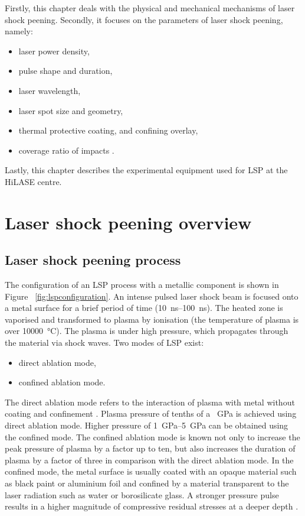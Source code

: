 Firstly, this chapter deals with the physical and mechanical mechanisms of laser shock peening. Secondly, it focuses on the parameters of laser shock peening, namely:

\begin{itemize}
    
    \item laser power density,
    \item pulse shape and duration,
    \item laser wavelength,
    \item laser spot size and geometry,
    \item thermal protective coating, and confining overlay,
    \item coverage ratio of impacts \cite{dane_2000}.

\end{itemize}

 Lastly, this chapter describes the experimental equipment used for LSP at the HiLASE centre. 


\section{Laser shock peening overview}

\subsection{Laser shock peening process}
The configuration of an LSP process with a metallic component is shown in Figure~ \ref{fig:lspconfiguration}. An intense pulsed laser shock beam is focused onto a metal surface for a brief period of time (\SIrange{10}{100}{\ns}). The heated zone is vaporised and transformed to plasma by ionisation (the temperature of plasma is over \SI{10000}{\degreeCelsius}). The plasma is under high pressure, which propagates through the material via shock waves. Two modes of LSP exist: 

\begin{itemize}

    \item direct ablation mode,
    \item confined ablation mode.

\end{itemize}

The direct ablation mode refers to the interaction of plasma with metal without coating and confinement \cite{sano}. Plasma pressure of tenths of a \SI{}{\GPa} is achieved using direct ablation mode. Higher pressure of \SIrange{1}{5}{\GPa} can be obtained using the confined mode. The confined ablation mode is known not only to increase the peak pressure of plasma by a factor up to ten, but also increases the duration of plasma by a factor of three in comparison with the direct ablation mode. In the confined mode, the metal surface is usually coated with an opaque material such as black paint or aluminium foil and confined by a material transparent to the laser radiation such as water or borosilicate glass. A stronger pressure pulse results in a higher magnitude of compressive residual stresses at a deeper depth \cite{fairland}. 

